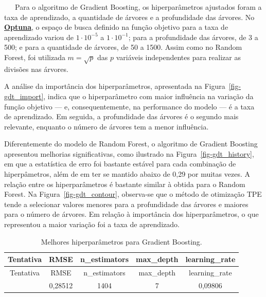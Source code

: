 \documentclass[
  12pt,
  a4paper,
]{scrreprt}
\begin{document}
~~~Para o algoritmo de Gradient Boosting, os hiperparâmetros ajustados
foram a taxa de aprendizado, a quantidade de árvores e a profundidade
das árvores. No \href{https://optuna.org/}{\textbf{Optuna}}, o espaço de
busca definido na função objetivo para a taxa de aprendizado variou de
\(1 \cdot 10^{-5}\) a \(1 \cdot 10^{-1}\); para a profundidade das
árvores, de 3 a 500; e para a quantidade de árvores, de 50 a 1500. Assim
como no Random Forest, foi utilizada \(m = \sqrt{p}\)\hspace{0pt} das
\(p\) variáveis independentes para realizar as divisões nas árvores.

\vspace{12pt}

A análise da importância dos hiperparâmetros, apresentada na
Figura~\ref{fig-gdt_import}, indica que o hiperparâmetro com maior
influência na variação da função objetivo --- e, consequentemente, na
performance do modelo --- é a taxa de aprendizado. Em seguida, a
profundidade das árvores é o segundo mais relevante, enquanto o número
de árvores tem a menor influência.

\vspace{12pt}

Diferentemente do modelo de Random Forest, o algoritmo de Gradient
Boosting apresentou melhorias significativas, como ilustrado na
Figura~\ref{fig-gdt_history}, em que a estatística de erro foi bastante
estável para cada combinação de hiperpâmetros, além de em ter se mantido
abaixo de 0,29 por muitas vezes. A relação entre os hiperparâmetros é
bastante similar à obtida para o Random Forest. Na
Figura~\ref{fig-gdt_contour}, observa-se que o método de otimização TPE
tende a selecionar valores menores para a profundidade das árvores e
maiores para o número de árvores. Em relação à importância dos
hiperparâmetros, o que representou a maior variação foi a taxa de
aprendizado.

\begin{longtable}[]{@{}ccccc@{}}
\caption{Melhores hiperparâmetros para Gradient
Boosting.}\label{tbl-params_gdt}\tabularnewline
\toprule\noalign{}
Tentativa & RMSE & n\_estimators & max\_depth & learning\_rate \\
\midrule\noalign{}
\endfirsthead
\toprule\noalign{}
Tentativa & RMSE & n\_estimators & max\_depth & learning\_rate \\
\midrule\noalign{}
\endhead
\bottomrule\noalign{}
\endlastfoot
57 & 0,28512 & 1404 & 7 & 0,09806 \\
\end{longtable}
\end{document}

